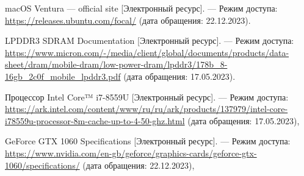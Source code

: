 \begin{thebibliography}{}
	macOS Ventura --- official site [Электронный
	ресурс]. --- Режим доступа: \url{https://releases.ubuntu.com/focal/} (дата обращения: 22.12.2023).

	LPDDR3 SDRAM Documentation [Электронный
	ресурс]. --- Режим доступа: \url{https://www.micron.com/-/media/client/global/documents/products/data-sheet/dram/mobile-dram/low-power-dram/lpddr3/178b_8-16gb_2c0f_mobile_lpddr3.pdf} (дата обращения: 17.05.2023).

	Процессор Intel Core™ i7-8559U [Электронный ресурс]. --- Режим доступа: \url{https://ark.intel.com/content/www/ru/ru/ark/products/137979/intel-core-i78559u-processor-8m-cache-up-to-4-50-ghz.html} (дата обращения: 17.05.2023),
	
	GeForce GTX 1060 Specifications [Электронный ресурс]. --- Режим доступа: \url{https://www.nvidia.com/en-gb/geforce/graphics-cards/geforce-gtx-1060/specifications/} (дата обращения: 22.12.2023),

\end{thebibliography}
\endgroup

\pagebreak